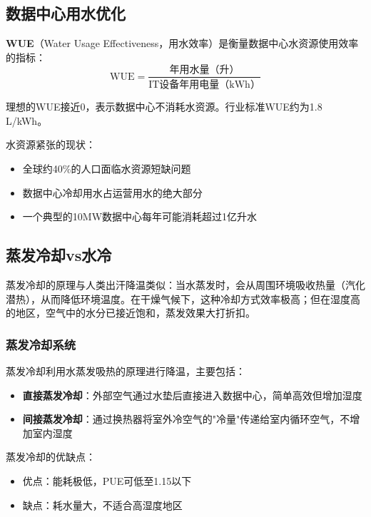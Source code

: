 \subsection{数据中心用水优化}

\begin{definition}[用水效率指标]
\textbf{WUE}（Water Usage Effectiveness，用水效率）是衡量数据中心水资源使用效率的指标：
\begin{equation}
    \text{WUE} = \frac{\text{年用水量（升）}}{\text{IT设备年用电量（kWh）}}
\end{equation}

理想的WUE接近0，表示数据中心不消耗水资源。行业标准WUE约为1.8 L/kWh。
\end{definition}

水资源紧张的现状：
\begin{itemize}
    \item 全球约40\%的人口面临水资源短缺问题
    \item 数据中心冷却用水占运营用水的绝大部分
    \item 一个典型的10MW数据中心每年可能消耗超过1亿升水
\end{itemize}

\subsection{蒸发冷却vs水冷}

\begin{analogy}
蒸发冷却的原理与人类出汗降温类似：当水蒸发时，会从周围环境吸收热量（汽化潜热），从而降低环境温度。在干燥气候下，这种冷却方式效率极高；但在湿度高的地区，空气中的水分已接近饱和，蒸发效果大打折扣。
\end{analogy}

\subsubsection{蒸发冷却系统}

蒸发冷却利用水蒸发吸热的原理进行降温，主要包括：
\begin{itemize}
    \item \textbf{直接蒸发冷却}：外部空气通过水垫后直接进入数据中心，简单高效但增加湿度
    \item \textbf{间接蒸发冷却}：通过换热器将室外冷空气的"冷量"传递给室内循环空气，不增加室内湿度
\end{itemize}

蒸发冷却的优缺点：
\begin{itemize}
    \item 优点：能耗极低，PUE可低至1.15以下
    \item 缺点：耗水量大，不适合高湿度地区
\end{itemize}

